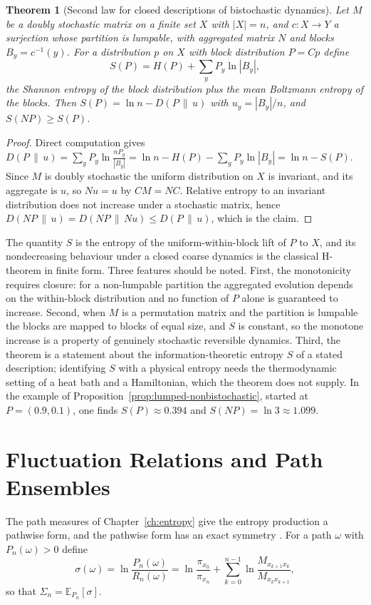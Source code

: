 \documentclass[11pt,oneside]{book}
\newtheorem{theorem}{Theorem}[chapter]
\theoremstyle{definition}
\theoremstyle{remark}
\begin{document}
\begin{theorem}[Second law for closed descriptions of bistochastic dynamics]\label{thm:second-law}
Let $M$ be a doubly stochastic matrix on a finite set $X$ with $|X|=n$, and $c\colon X\to Y$ a surjection whose partition is lumpable, with aggregated matrix $N$ and blocks $B_y=c^{-1}(y)$. For a distribution $p$ on $X$ with block distribution $P=Cp$ define
\[
S(P)=H(P)+\sum_yP_y\ln|B_y|,
\]
the Shannon entropy of the block distribution plus the mean Boltzmann entropy of the blocks. Then $S(P)=\ln n-D(P\,\|\,u)$ with $u_y=|B_y|/n$, and $S(NP)\geq S(P)$.
\end{theorem}

\begin{proof}
Direct computation gives $D(P\,\|\,u)=\sum_yP_y\ln\frac{nP_y}{|B_y|}=\ln n-H(P)-\sum_yP_y\ln|B_y|=\ln n-S(P)$. Since $M$ is doubly stochastic the uniform distribution on $X$ is invariant, and its aggregate is $u$, so $Nu=u$ by $CM=NC$. Relative entropy to an invariant distribution does not increase under a stochastic matrix, hence $D(NP\,\|\,u)=D(NP\,\|\,Nu)\leq D(P\,\|\,u)$, which is the claim.
\end{proof}

The quantity $S$ is the entropy of the uniform-within-block lift of $P$ to $X$, and its nondecreasing behaviour under a closed coarse dynamics is the classical H-theorem in finite form. Three features should be noted. First, the monotonicity requires closure: for a non-lumpable partition the aggregated evolution depends on the within-block distribution and no function of $P$ alone is guaranteed to increase. Second, when $M$ is a permutation matrix and the partition is lumpable the blocks are mapped to blocks of equal size, and $S$ is constant, so the monotone increase is a property of genuinely stochastic reversible dynamics. Third, the theorem is a statement about the information-theoretic entropy $S$ of a stated description; identifying $S$ with a physical entropy needs the thermodynamic setting of a heat bath and a Hamiltonian, which the theorem does not supply. In the example of Proposition~\ref{prop:lumped-nonbistochastic}, started at $P=(0.9,0.1)$, one finds $S(P)\approx0.394$ and $S(NP)=\ln3\approx1.099$.

\chapter{Fluctuation Relations and Path Ensembles}\label{ch:fluct}

The path measures of Chapter~\ref{ch:entropy} give the entropy production a pathwise form, and the pathwise form has an exact symmetry \cite{crooks1999,seifert2012}. For a path $\omega$ with $P_n(\omega)>0$ define
\[
\sigma(\omega)=\ln\frac{P_n(\omega)}{R_n(\omega)}=\ln\frac{\pi_{x_0}}{\pi_{x_n}}+\sum_{k=0}^{n-1}\ln\frac{M_{x_{k+1}x_k}}{M_{x_kx_{k+1}}},
\]
so that $\Sigma_n=\mathbb E_{P_n}[\sigma]$.
\end{document}
